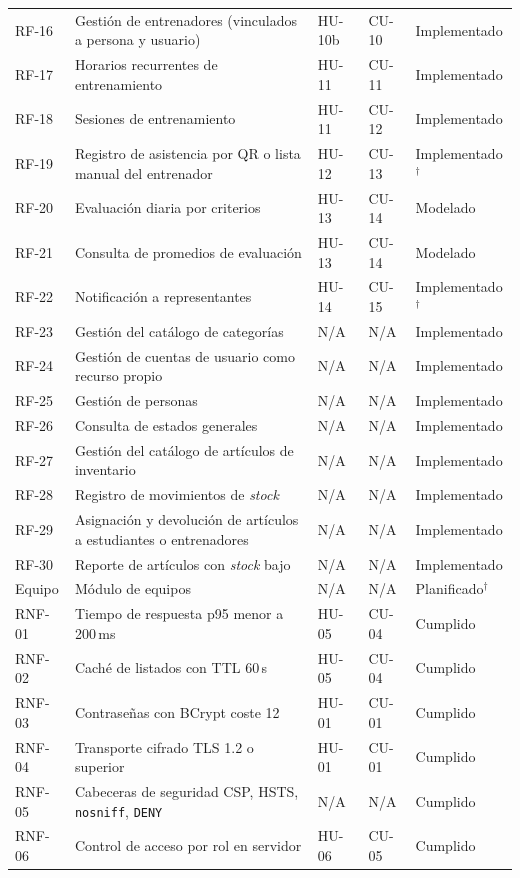 \documentclass[11pt,a4paper]{article}
\begin{document}
\begin{longtable}{@{}p{1.5cm}p{6.3cm}p{1.4cm}p{1.4cm}p{2.1cm}@{}}
RF-16 & Gestión de entrenadores (vinculados a persona y usuario) & HU-10b & CU-10 & Implementado \\
RF-17 & Horarios recurrentes de entrenamiento & HU-11 & CU-11 & Implementado \\
RF-18 & Sesiones de entrenamiento & HU-11 & CU-12 & Implementado \\
RF-19 & Registro de asistencia por QR o lista manual del entrenador & HU-12 & CU-13 & Implementado$^\dagger$ \\
RF-20 & Evaluación diaria por criterios & HU-13 & CU-14 & Modelado \\
RF-21 & Consulta de promedios de evaluación & HU-13 & CU-14 & Modelado \\
RF-22 & Notificación a representantes & HU-14 & CU-15 & Implementado$^\dagger$ \\
RF-23 & Gestión del catálogo de categorías & N/A & N/A & Implementado \\
RF-24 & Gestión de cuentas de usuario como recurso propio & N/A & N/A & Implementado \\
RF-25 & Gestión de personas & N/A & N/A & Implementado \\
RF-26 & Consulta de estados generales & N/A & N/A & Implementado \\
RF-27 & Gestión del catálogo de artículos de inventario & N/A & N/A & Implementado \\
RF-28 & Registro de movimientos de \emph{stock} & N/A & N/A & Implementado \\
RF-29 & Asignación y devolución de artículos a estudiantes o entrenadores & N/A & N/A & Implementado \\
RF-30 & Reporte de artículos con \emph{stock} bajo & N/A & N/A & Implementado \\
Equipo & Módulo de equipos & N/A & N/A & Planificado$^\dagger$ \\
RNF-01 & Tiempo de respuesta p95 menor a 200\,ms & HU-05 & CU-04 & Cumplido \\
RNF-02 & Caché de listados con TTL 60\,s & HU-05 & CU-04 & Cumplido \\
RNF-03 & Contraseñas con BCrypt coste 12 & HU-01 & CU-01 & Cumplido \\
RNF-04 & Transporte cifrado TLS 1.2 o superior & HU-01 & CU-01 & Cumplido \\
RNF-05 & Cabeceras de seguridad CSP, HSTS, \texttt{nosniff}, \texttt{DENY} & N/A & N/A & Cumplido \\
RNF-06 & Control de acceso por rol en servidor & HU-06 & CU-05 & Cumplido \\

\end{longtable}
\end{document}
